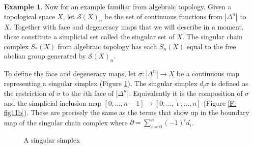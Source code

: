 \documentclass[12pt]{article}
\theoremstyle{plain}
\theoremstyle{definition}
\newtheorem{example}[theorem]{Example}
\newcommand{\bd}{\partial}
\newcommand{\ms}[1]{\mathscr{#1}}
\begin{document}
\begin{example}\label{E: singular}
Now for an example familiar from algebraic topology. Given a topological space $X$, let  $\ms S(X)_n$ be the set of continuous functions from $|\Delta^n|$  to $X$. Together with face and degeneracy maps that we will describe in a moment, these constitute a simplicial set called the singular set of $X$. The singular chain complex $S_*(X)$  from algebraic topology has each $S_n(X)$ equal to the free abelian group generated by $\ms S(X)_n$. 

To define the face and degeneracy maps,  let $\sigma\colon|\Delta^n|\to X$ be a continuous map representing a singular simplex (Figure \ref{F: fig11a}). The singular simplex $d_i\sigma$ is defined as the  restriction of  $\sigma$ to the $i$th face of $|\Delta^n|$. Equivalently it is the composition of $\sigma$ and the simplicial inclusion map $[0,\ldots, n-1]\to [0,\ldots, \hat \imath,\ldots, n]$ (Figure \ref{F: fig11b}). These are precisely the same as the terms that show up in the boundary map of the singular chain  complex where $\bd=\sum_{i=0}^n(-1)^id_i$. 
\begin{figure}[!htp]
\begin{center}
\end{center}
\caption{A singular simplex}\label{F: fig11a}
\end{figure}



\end{example}
\end{document}
